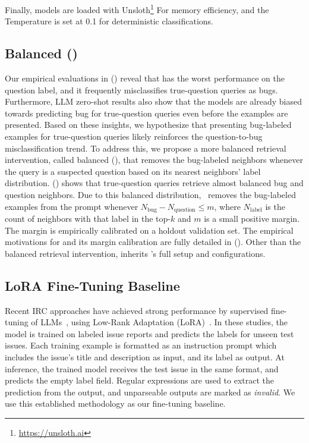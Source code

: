 Finally, models are loaded with Unsloth\footnote{\url{https://unsloth.ai}} For memory efficiency, and the Temperature is set at 0.1 for deterministic classifications.

\subsection{Balanced \ragtag (\bragtag)}
\label{sec:approach-bragtag}
Our empirical evaluations in () reveal that \ragtag has the worst performance on the question label, and it frequently misclassifies true-question queries as bugs. Furthermore, LLM zero-shot results also show that the models are already biased towards predicting bug for true-question queries even before the examples are presented. Based on these insights, we hypothesize that presenting bug-labeled examples for true-question queries likely reinforces the question-to-bug misclassification trend. To address this, we propose a more balanced retrieval intervention, called balanced \ragtag (\bragtag), that removes the bug-labeled neighbors whenever the query is a suspected question based on its nearest neighbors' label distribution. () shows that true-question queries retrieve almost balanced bug and question neighbors. Due to this balanced distribution, \bragtag\ removes the bug-labeled examples from the prompt whenever $N_\text{bug} - N_\text{question} \le m$, where $N_\text{label}$ is the count of neighbors with that label in the top-$k$ and $m$ is a small positive margin. The margin is empirically calibrated on a holdout validation set. The empirical motivations for \bragtag and its margin calibration are fully detailed in (). Other than the balanced retrieval intervention, \bragtag inherits \ragtag's full setup and configurations.



\subsection{LoRA Fine-Tuning Baseline}
\label{sec:finetune}
Recent IRC approaches have achieved strong performance by supervised
fine-tuning of LLMs~\cite{heo2025study,aracena2025applying,
aracena2024applyinglargelanguagemodels}, using Low-Rank Adaptation
(LoRA)~\cite{hu2022lora}. In these studies, the
model is trained on labeled issue reports and predicts the labels for
unseen test issues. Each training example is formatted as an
instruction prompt which includes the issue's title and description
as input, and its label as output. At inference, the trained model
receives the test issue in the same format, and predicts the empty
label field. Regular expressions are used to extract the prediction
from the output, and unparseable outputs are marked as
\textit{invalid}. We use this established methodology as our fine-tuning baseline.

